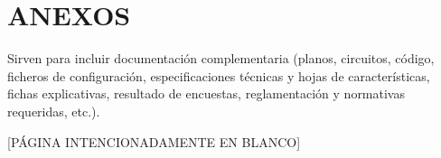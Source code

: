 \chapter*{ANEXOS}
Sirven para incluir documentaci\'on complementaria (planos, circuitos, c\'odigo, ficheros de configuraci\'on, especificaciones t\'ecnicas y hojas de caracter\'isticas, fichas explicativas, resultado de encuestas, reglamentaci\'on y normativas requeridas, etc.).

\clearpage
\thispagestyle{empty}
\vspace*{\fill}
\begin{center}
[P\'AGINA INTENCIONADAMENTE EN BLANCO]
\end{center}
\vspace*{\fill}

